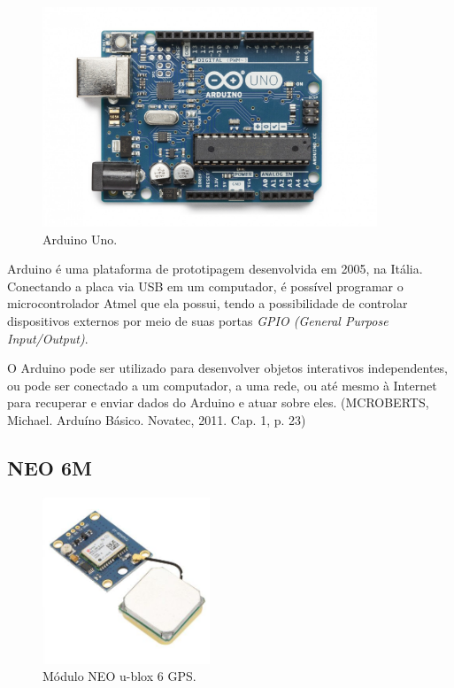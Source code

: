 \documentclass[
	12pt,				%
	oneside,			%
	a4paper,			%
	brazil				%
]{abntex2}
\begin{document}
{\begin{figure}[!h]
\centering
\includegraphics[width=10cm, center]{images/arduino}
\caption{Arduino Uno.}
\label{Rotulo}
\end{figure}

Arduino é uma plataforma de prototipagem desenvolvida em 2005, na Itália. Conectando a placa via USB em um computador, é possível programar o microcontrolador Atmel que ela possui, tendo a possibilidade de controlar dispositivos externos por meio de suas portas \textit{GPIO (General Purpose Input/Output)}.

O Arduino pode ser utilizado para desenvolver objetos interativos independentes,
ou pode ser conectado a um computador, a uma rede, ou até mesmo à Internet para
recuperar e enviar dados do Arduino e atuar sobre eles. (MCROBERTS, Michael. Arduíno Básico. Novatec, 2011. Cap. 1, p. 23)

\newpage

\subsection{NEO 6M}

\begin{figure}[H]
\centering
\includegraphics[width=5cm, center]{images/neo-6m}
\caption{Módulo NEO u-blox 6 GPS.}
\label{Rotulo}
\end{figure}

}
\end{document}
